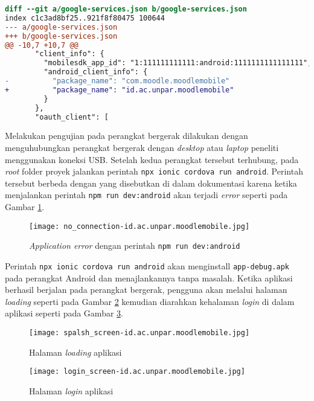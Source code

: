\begin{lstlisting}[language = diff, frame=single, label ={google-service.json}, caption = Menyesuaikan \texttt{package\_name} dengan \texttt{app\_id} pada \texttt{google-service.json} ]
diff --git a/google-services.json b/google-services.json
index c1c3ad8bf25..921f8f80475 100644
--- a/google-services.json
+++ b/google-services.json
@@ -10,7 +10,7 @@
       "client_info": {
         "mobilesdk_app_id": "1:111111111111:android:1111111111111111",
         "android_client_info": {
-          "package_name": "com.moodle.moodlemobile"
+          "package_name": "id.ac.unpar.moodlemobile"
         }
       },
       "oauth_client": [
\end{lstlisting}

Melakukan pengujian pada perangkat bergerak dilakukan dengan menguhubungkan perangkat bergerak dengan \textit{desktop} atau \textit{laptop} peneliti menggunakan koneksi USB. Setelah kedua perangkat tersebut terhubung, pada \textit{root} folder proyek jalankan perintah \texttt{npx ionic cordova run android}. Perintah tersebut berbeda dengan yang disebutkan di dalam dokumentasi karena ketika menjalankan perintah \texttt{npm run dev:android} akan terjadi \textit{error} seperti pada Gambar \ref{app:error:no-connection}.

\begin{figure}[H] 
	\centering  
	\texttt{[image: no\_connection-id.ac.unpar.moodlemobile.jpg]}  
	\caption[\textit{Application error} dengan perintah \texttt{npm run dev:android}] {\textit{Application error} dengan perintah \texttt{npm run dev:android}} 
	\label{app:error:no-connection} 
\end{figure} 

Perintah \texttt{npx ionic cordova run android} akan menginstall \texttt{app-debug.apk} pada perangkat Android dan menajlankannya tanpa masalah. Ketika aplikasi berhasil berjalan pada perangkat bergerak, pengguna akan melalui halaman \textit{loading} seperti pada Gambar \ref{app:loading} kemudian diarahkan kehalaman \textit{login} di dalam aplikasi seperti pada Gambar \ref{app:login}.

\begin{figure}[H] 
	\centering  
	\texttt{[image: spalsh\_screen-id.ac.unpar.moodlemobile.jpg]}  
	\caption[Halaman \textit{loading} aplikasi] {Halaman \textit{loading} aplikasi} 
	\label{app:loading} 
\end{figure}

\begin{figure}[H] 
	\centering  
	\texttt{[image: login\_screen-id.ac.unpar.moodlemobile.jpg]}  
	\caption[Halaman \textit{login} aplikasi] {Halaman \textit{login} aplikasi} 
	\label{app:login} 
\end{figure}  

